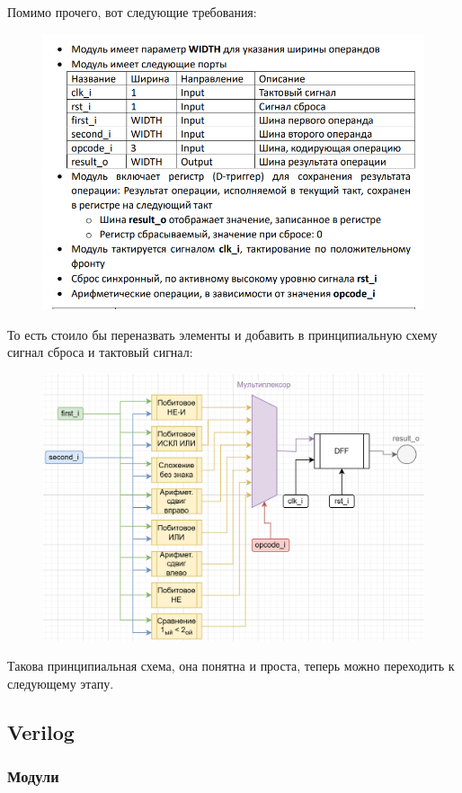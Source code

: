 \documentclass[a4paper,12pt]{article} %
\begin{document}
Помимо прочего, вот следующие требования:
\begin{figure}[H]
    \centering
    \includegraphics[width=1\linewidth]{Intro/ТЗ.png}
\end{figure}
То есть стоило бы переназвать элементы и добавить в принципиальную схему сигнал сброса и тактовый сигнал:
\begin{figure}[H]
    \centering
    \includegraphics[width=1\linewidth]{Intro/АЛУ1.png}
\end{figure}
Такова принципиальная схема, она понятна и проста, теперь можно переходить к следующему этапу.
\subsection{Verilog}
\subsubsection{Модули}
\end{document}

